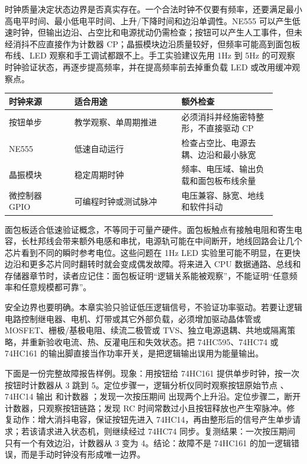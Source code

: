 时钟质量决定状态边界是否真实存在。一个合法时钟不仅要有频率，还要满足最小高电平时间、最小低电平时间、上升/下降时间和边沿单调性。NE555 可以产生低速时钟，但输出边沿、占空比和电源扰动仍需检查；按钮可以产生人工事件，但未经消抖不应直接作为计数器 CP；晶振模块边沿质量较好，但频率可能高到面包板布线、LED 观察和手工调试都跟不上。手工实验建议先用 1Hz 到 5Hz 的可观察时钟验证状态，再逐步提高频率，并在提高频率前去掉重负载 LED 或改用缓冲观察点。

\begin{longtable}{L{0.22\linewidth}L{0.36\linewidth}L{0.32\linewidth}}
\toprule
时钟来源 & 适合用途 & 额外检查 \\
\midrule
按钮单步 & 教学观察、单周期推进 & 必须消抖并经施密特整形，不直接驱动 CP \\
NE555 & 低速自动运行 & 检查占空比、电源去耦、边沿和最小脉宽 \\
晶振模块 & 稳定周期时钟 & 频率、电压域、输出负载和面包板布线余量 \\
微控制器 GPIO & 可编程时钟或测试脉冲 & 电压兼容、脉宽、地线和软件抖动 \\
\bottomrule
\end{longtable}

面包板适合低速验证概念，不等同于可量产硬件。面包板触点有接触电阻和寄生电容，长杜邦线会带来额外电感和串扰，电源轨可能在中间断开，地线回路会让几个芯片看到不同的瞬时参考电位。这些问题在 1Hz LED 实验里可能不明显，在更快边沿和更多芯片同时翻转时就会变成偶发故障。将来进入 CPU 数据通路、总线和存储器章节时，读者应记住：面包板证明“逻辑关系能被观察”，不能证明“任意频率和任意规模都可靠”。

安全边界也要明确。本章实验只验证低压逻辑信号，不验证功率驱动。若要让逻辑电路控制继电器、电机、灯带或其它外部负载，必须增加驱动晶体管或 MOSFET、栅极/基极电阻、续流二极管或 TVS、独立电源退耦、共地或隔离策略，并重新验收电流、热、反灌电压和失效状态。把 74HC595、74HC74 或 74HC161 的输出脚直接当作功率开关，是把逻辑输出误用为能量输出。

下面是一份完整故障报告样例。现象：用按钮给 74HC161 提供单步时钟，按一次按钮时计数器从 3 跳到 5。定位步骤一，逻辑分析仪同时观察按钮原始节点 、74HC14 输出  和计数器 ；发现一次按压期间  出现两个上升沿。定位步骤二，断开计数器，只观察按钮链路；发现 RC 时间常数过小且按钮释放也产生窄脉冲。修复动作：增大消抖电容，保证按钮先进入 74HC14，再由整形后的信号产生单步请求；若该请求进入状态机，则继续经过 74HC74 同步。复测结果：一次按压期间  只有一个有效边沿，计数器从 3 变为 4。结论：故障不是 74HC161 的加一逻辑错误，而是手动时钟没有形成唯一边界。

